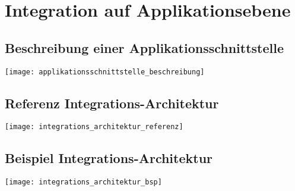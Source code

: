 
\section{Integration auf Applikationsebene}
\subsection{Beschreibung einer Applikationsschnittstelle}
\texttt{[image: applikationsschnittstelle\_beschreibung]}
\subsection{Referenz Integrations-Architektur}
\texttt{[image: integrations\_architektur\_referenz]}
\subsection{Beispiel Integrations-Architektur}
\texttt{[image: integrations\_architektur\_bsp]}